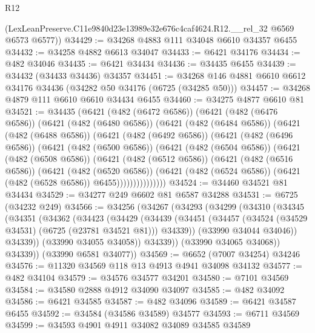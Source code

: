 \begin{lexlean}{R12}
\begin{coremodule}
      (LexLeanPreserve.C11e9840d23e13989e32e676c4caf4624.R12.__rel_32 @6569 @6573 @6577))
@34429 := @34268 @4883 @111 @34048 @6610 @34357 @6455
@34432 := @34258 @4882 @6613 @34047
@34433 := @6421 @34176
@34434 := @482 @34046
@34435 := @6421 @34434
@34436 := @34435 @6455
@34439 := @34432 (@34433 @34436) @34357
@34451 := @34268 @146 @4881 @6610 @6612 @34176 @34436 (@34282 @50 @34176 (@6725 (@34285 @50)))
@34457 := @34268 @4879 @111 @6610 @6610 @34434 @6455
@34460 := @34275 @4877 @6610 @81
@34521 := @34435
    (@6421
      (@482 (@6472 @6586))
      (@6421
        (@482 (@6476 @6586))
        (@6421
          (@482 (@6480 @6586))
          (@6421
            (@482 (@6484 @6586))
            (@6421
              (@482 (@6488 @6586))
              (@6421
                (@482 (@6492 @6586))
                (@6421
                  (@482 (@6496 @6586))
                  (@6421
                    (@482 (@6500 @6586))
                    (@6421
                      (@482 (@6504 @6586))
                      (@6421
                        (@482 (@6508 @6586))
                        (@6421
                          (@482 (@6512 @6586))
                          (@6421
                            (@482 (@6516 @6586))
                            (@6421
                              (@482 (@6520 @6586))
                              (@6421
                                (@482 (@6524 @6586))
                                (@6421 (@482 (@6528 @6586)) @6455)))))))))))))))
@34524 := @34460 @34521 @81 @34434
@34529 := @34277 @249 @6602 @81 @6587 @34288
@34531 := @6725 (@34232 @249)
@34566 := @34256
    (@34267
      (@34293
        (@34299
          (@34310
            (@34345
              (@34351
                (@34362
                  (@34423
                    (@34429
                      (@34439
                        (@34451
                          (@34457 (@34524 (@34529 @34531) (@6725 (@23781 @34521 @81))) @34339))
                        (@33990 @34044 @34046))
                      @34339))
                  (@33990 @34055 @34058))
                @34339))
            (@33990 @34065 @34068))
          @34339))
      (@33990 @6581 @34077))
@34569 := @6652 (@7007 @34254) @34246
@34576 := @11320 @34569 @118 @13 @4913 @4941 @34098 @34132
@34577 := @482 @34104
@34579 := @34576 @34577 @34201
@34580 := @7101 @34569
@34584 := @34580 @2888 @4912 @34090 @34097
@34585 := @482 @34092
@34586 := @6421 @34585
@34587 := @482 @34096
@34589 := @6421 @34587 @6455
@34592 := @34584 (@34586 @34589) @34577
@34593 := @6711 @34569
@34599 := @34593 @4901 @4911 @34082 @34089 @34585 @34589

\end{coremodule}
\end{lexlean}
